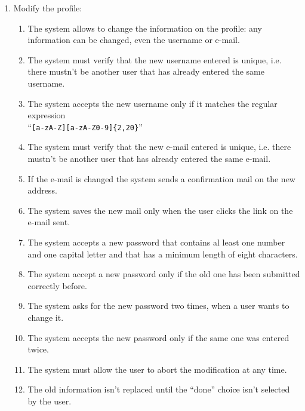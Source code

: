 \begin{enumerate}
\item Modify the profile:
\begin{enumerate}
\item The system allows to change the information on the profile: any information can be changed, even the username or e-mail. 
\item The system must verify that the new username entered is unique, i.e. there mustn't be another user that has already entered the same username.  \label{f-modify-usrn1}
\item  The system accepts the new username only if it matches the regular expression\\``\texttt{[a-zA-Z][a-zA-Z0-9]\{2,20\}}''   \label{f-modify-usrn2} 
\item The system must verify that the new e-mail entered is unique, i.e. there mustn't be another user that has already entered the same e-mail.   \label{f-modify-mail1}
\item If the e-mail is changed the system sends a confirmation mail on the new address.
\item The system saves the new mail only when the user clicks the link on the e-mail sent.   \label{f-modify-mail2}
\item The system accepts a new password that contains al least one number and one capital letter and that has a minimum length of eight characters.   \label{f-modify-pswd1}
\item The system accept a new password only if the old one has been submitted correctly before.  \label{f-modify-pswd2}
\item The system asks for the new password two times, when a user wants to change it. 
\item The system accepts the new password only if the same one was entered twice.  \label{f-modify-pswd3}
\item The system must allow the user to abort the modification at any time.
\item The old information isn't  replaced until the ``done'' choice isn't selected by the user.
\end{enumerate}




\end{enumerate}




